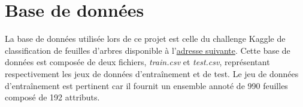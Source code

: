 \section{Base de données}
La base de données utilisée lors de ce projet est celle du challenge Kaggle de classification de feuilles d'arbres disponible à l'\href{www.kaggle.com/c/leaf-classification}{adresse suivante}.
Cette base de données est composée de deux fichiers, \emph{train.csv} et \emph{test.csv}, représentant respectivement les jeux de données d'entraînement et de test.  
Le jeu de données d'entraînement est pertinent car il fournit un ensemble annoté de 990 feuilles composé de 192 attributs.
